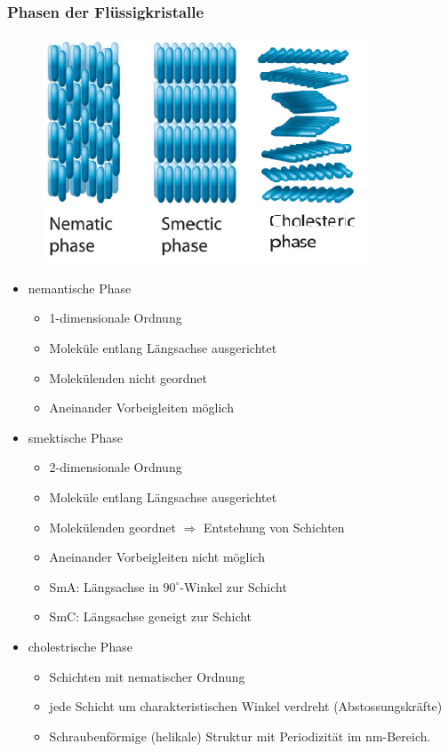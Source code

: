\subsubsection{Phasen der Flüssigkristalle}
\begin{figure}[htbp]
	\centering
	\includegraphics[width=0.5\linewidth]{images/11_Phasen.png}
\end{figure}
\begin{itemize}
	\item nemantische Phase
		\begin{itemize}
			\item 1-dimensionale Ordnung
			\item Moleküle entlang Längsachse ausgerichtet
			\item Molekülenden nicht geordnet
			\item Aneinander Vorbeigleiten möglich
		\end{itemize}
	\item smektische Phase
		\begin{itemize}
			\item 2-dimensionale Ordnung
			\item Moleküle entlang Längsachse ausgerichtet
			\item Molekülenden geordnet $\Rightarrow$ Entstehung von Schichten
			\item Aneinander Vorbeigleiten nicht möglich
			\item SmA: Längsachse in $90^\circ$-Winkel zur Schicht
			\item SmC: Längsachse geneigt zur Schicht
		\end{itemize}
	\item cholestrische Phase
		\begin{itemize}
			\item Schichten mit nematischer Ordnung
			\item jede Schicht um charakteristischen Winkel verdreht (Abstossungskräfte)
			\item Schraubenförmige (helikale) Struktur mit Periodizität im nm-Bereich.
		\end{itemize}
\end{itemize}

